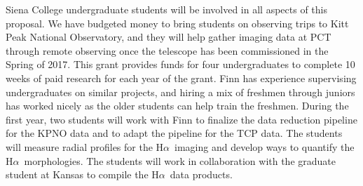 \documentclass[11pt, preprint]{aastex}
\newcommand{\ha}{H$\alpha$}
\begin{document}
{%


Siena College undergraduate students will be involved in all aspects
of this proposal.  We have budgeted money to bring students on
observing trips to Kitt Peak National Observatory, and they will help
gather imaging data at PCT through remote observing once the telescope
has been commissioned in the Spring of 2017.  This grant provides funds for four
undergraduates to complete 10 weeks of paid research for each year of
the grant.  Finn has experience supervising undergraduates on similar
projects, and hiring a mix of freshmen through juniors has worked
nicely as the older students can help train the freshmen.  
During the first year, two students will work with Finn to
finalize the data reduction pipeline for the KPNO data and to adapt
the pipeline for the TCP data.  The students will measure radial
profiles for the \ha\ imaging and develop ways to quantify the \ha\
morphologies.  The students will work in collaboration with the
graduate student at Kansas to compile the \ha\ data products.

}
\end{document}
